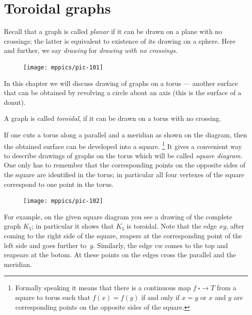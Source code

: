 \chapter{Toroidal graphs}

Recall that a graph is called \emph{planar} if it can be drawn on a plane with no crossings; the latter is equivalent to existence of its drawing on a sphere.
Here and further, we say \emph{drawing} for \emph{drawing with no crossings}.  

\begin{figure}
\vskip-2mm
\centering
\texttt{[image: mppics/pic-101]}
\end{figure}

In this chapter we will discuss drawing of graphs on a torus --- another surface that can be obtained by revolving a circle about an axis (this is the surface of a donut).

A graph is called \emph{toroidal}, if it can be drawn on a torus with no crossing.

If one cuts a torus along a parallel and a meridian as shown on the diagram,
then the obtained surface can be developed into a square.%
\footnote{Formally speaking it means that there is a continuous map $f\:\square\to T$ from a square to torus  such that $f(x)=f(y)$ if and only if $x=y$ or $x$ and $y$ are corresponding points on the opposite sides of the square.}
It gives a convenient way to describe drawings of graphs on the torus which will be called \emph{square diagram}.
One only has to remember that the corresponding points on the opposite sides of the square are identified in the torus;
in particular all four vertexes of the square correspond to one point in the torus.

{

\begin{figure}
\vskip-4mm
\centering
\texttt{[image: mppics/pic-102]}
\end{figure}

For example, on the given square diagram you see a drawing of the  complete graph $K_5$;
in particular it shows that $K_5$ is toroidal.
Note that the edge $xy$,
after coming to the right side of the square, reapers at the corresponding point of the left side and goes further to~$y$.
Similarly, the edge $vw$ comes to the top and reapears at the botom.
At these points on the edges cross the parallel and the meridian.

}

